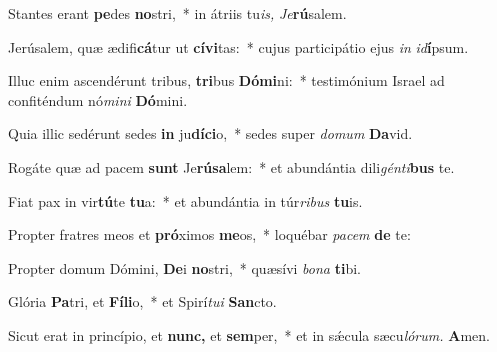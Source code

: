 \item Stantes erant \textbf{pe}des \textbf{no}stri,~* in átriis tu\textit{is,} \tinyhspace\textit{Je}\textbf{rú}salem.
\item Jerúsalem, quæ ædifi\textbf{cá}tur ut \textbf{cí}\textbf{vi}tas:~* cujus participátio ejus \textit{in} \textit{id}\textbf{í}psum.
\item Illuc enim ascendérunt tribus, \textbf{tri}bus \textbf{Dó}\textbf{mi}ni:~* testimónium Israel ad confiténdum nó\textit{mini} \textbf{Dó}mini.
\item Quia illic sedérunt sedes \textbf{in} ju\textbf{dí}\textbf{ci}o,~* sedes super \textit{domum} \textbf{Da}vid.
\item Rogáte quæ ad pacem \textbf{sunt} Je\textbf{rú}\textbf{sa}lem:~* et abundántia dili\textit{génti}\textbf{bus} te.
\item Fiat pax in vir\textbf{tú}te \textbf{tu}a:~* et abundántia in túr\textit{ribus} \textbf{tu}is.
\item Propter fratres meos et \textbf{pró}ximos \textbf{me}os,~* loquébar \textit{pacem} \textbf{de} te:
\item Propter domum Dómini, \textbf{De}i \textbf{no}stri,~* quæsívi \textit{bona} \textbf{ti}bi.
\item Glória \textbf{Pa}tri, et \textbf{Fíli}o,~* et Spirí\tinyhspace\textit{tui} \textbf{San}cto.
\item Sicut erat in princípio, et \textbf{nunc,} et \textbf{sem}per,~* et in sǽcula sæcu\tinyhspace\textit{lórum.} \textbf{A}men.